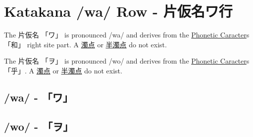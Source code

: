 \section{Katakana /wa/ Row - 片仮名ワ行}\label{sec:KatakanaWaRow}


\label{letter:wa} The 片仮名 {「ワ」} is pronounced  /wa/ and  derives from the
\hyperref[sec:PhoneticCharacter]{Phonetic Caracter}s {「和」} right site part.  A
\hyperref[sec:Dakuten]{濁点}  or \hyperref[sec:Handakuten]{半濁点} do not
exist.

\newpage

\label{letter:wo} The 片仮名 {「ヲ」} is pronounced  /wo/ and  derives from the
\hyperref[sec:PhoneticCharacter]{Phonetic Caracter}s {「乎」}.  A
\hyperref[sec:Dakuten]{濁点}  or \hyperref[sec:Handakuten]{半濁点} do not
exist.


\newpage

\subsection{/wa/ - 「ワ」}\label{sec:KatakanaWa}


\subsection{/wo/ - 「ヲ」}\label{sec:KatakanaWo}


%




\newpage
